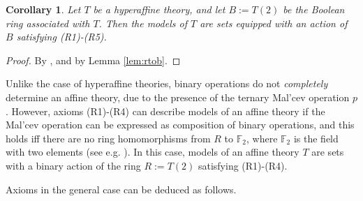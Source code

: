 \documentclass{amsart}
\numberwithin{equation}{section}
\theoremstyle{plain}
\newtheorem{corollary}[theorem]{Corollary}
\theoremstyle{definition}
\begin{document}
\begin{corollary}
  \label{thm:models}
  Let $T$ be a hyperaffine theory, 
  and let $B:=T(2)$ be the Boolean ring associated with $T$. 
  Then the models of $T$ are sets equipped with an action of $B$ satisfying \emph{(R1)-(R5)}. 
\end{corollary}
\begin{proof}
  By \cite[Proposition 3.16]{G24}, and by Lemma \ref{lem:rtob}. 
\end{proof}

Unlike the case of hyperaffine theories, binary operations do not \emph{completely} determine an affine theory, due to the presence of the ternary Mal'cev operation $p$. 
However, axioms (R1)-(R4) can describe models of an affine theory if the Mal'cev operation can be expressed as composition of binary operations, 
and this holds 
iff there are no ring homomorphisms from $R$ to $\mathbb{F}_2$, where $\mathbb{F}_2$ is the field with two elements (see e.g. \cite{S77,IKS78}).  
In this case, models of an affine theory $T$ are sets with a binary action of the ring $R:=T(2)$ satisfying (R1)-(R4). 

Axioms in the general case can be deduced as follows. 
\end{document}
